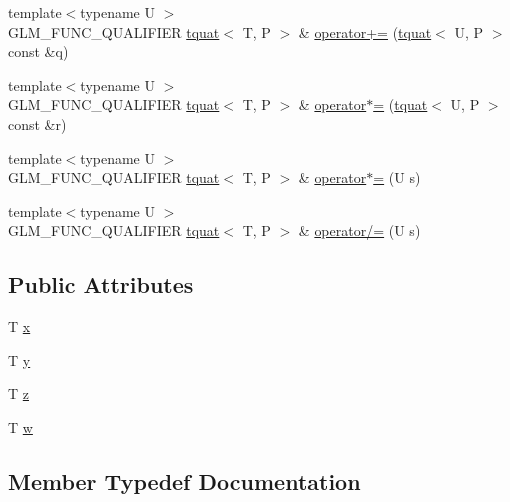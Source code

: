 \begin{DoxyCompactItemize}
{\footnotesize template$<$typename U $>$ }\\G\+L\+M\+\_\+\+F\+U\+N\+C\+\_\+\+Q\+U\+A\+L\+I\+F\+I\+E\+R \hyperlink{structglm_1_1tquat}{tquat}$<$ T, P $>$ \& \hyperlink{structglm_1_1tquat_a90b089779296e6f39f7aa9cddaf3ce83}{operator+=} (\hyperlink{structglm_1_1tquat}{tquat}$<$ U, P $>$ const \&q)
\item 
{\footnotesize template$<$typename U $>$ }\\G\+L\+M\+\_\+\+F\+U\+N\+C\+\_\+\+Q\+U\+A\+L\+I\+F\+I\+E\+R \hyperlink{structglm_1_1tquat}{tquat}$<$ T, P $>$ \& \hyperlink{structglm_1_1tquat_a98b7195afd81e7fbf097208c75602240}{operator$\ast$=} (\hyperlink{structglm_1_1tquat}{tquat}$<$ U, P $>$ const \&r)
\item 
{\footnotesize template$<$typename U $>$ }\\G\+L\+M\+\_\+\+F\+U\+N\+C\+\_\+\+Q\+U\+A\+L\+I\+F\+I\+E\+R \hyperlink{structglm_1_1tquat}{tquat}$<$ T, P $>$ \& \hyperlink{structglm_1_1tquat_aa6217e9a0b83ec0cabdd32dce73d8d05}{operator$\ast$=} (U s)
\item 
{\footnotesize template$<$typename U $>$ }\\G\+L\+M\+\_\+\+F\+U\+N\+C\+\_\+\+Q\+U\+A\+L\+I\+F\+I\+E\+R \hyperlink{structglm_1_1tquat}{tquat}$<$ T, P $>$ \& \hyperlink{structglm_1_1tquat_a320e96991b6611e14172310e42f72d5f}{operator/=} (U s)
\end{DoxyCompactItemize}
\subsection*{Public Attributes}
\begin{DoxyCompactItemize}
\item 
T \hyperlink{structglm_1_1tquat_a4e7a21e85428fa8d10e613f109185f28}{x}
\item 
T \hyperlink{structglm_1_1tquat_a06d5c5fb3b08ec993fb4dd74b22fc011}{y}
\item 
T \hyperlink{structglm_1_1tquat_a1b28678ac0e0b3ac2537059754df9fdf}{z}
\item 
T \hyperlink{structglm_1_1tquat_a91055a4c17113bd3f357ffd8595d8ac0}{w}
\end{DoxyCompactItemize}


\subsection{Member Typedef Documentation}
\hypertarget{structglm_1_1tquat_ab3ef67a20d129dcb01f042042218ba17}{}
